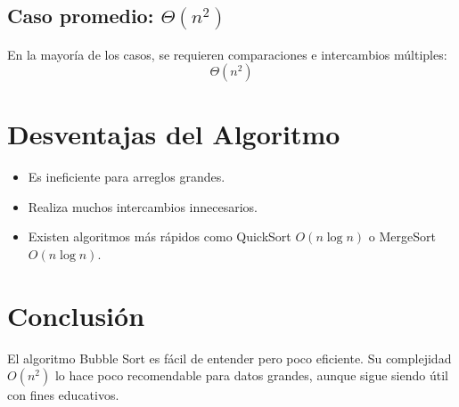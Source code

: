 \documentclass{article}
\begin{document}
		\subsection*{Caso promedio: \(\Theta(n^2)\)}
		En la mayoría de los casos, se requieren comparaciones e intercambios múltiples:
		\begin{equation}
			\Theta(n^2)
		\end{equation}
		
		\section{Desventajas del Algoritmo}
		\begin{itemize}
			\item Es ineficiente para arreglos grandes.
			\item Realiza muchos intercambios innecesarios.
			\item Existen algoritmos más rápidos como QuickSort \(O(n \log n)\) o MergeSort \(O(n \log n)\).
		\end{itemize}
		
		\section{Conclusión}
		El algoritmo Bubble Sort es fácil de entender pero poco eficiente. Su complejidad \(O(n^2)\) lo hace poco recomendable para datos grandes, aunque sigue siendo útil con fines educativos.
		

	
	
	
	
	
	
	
\end{document}
